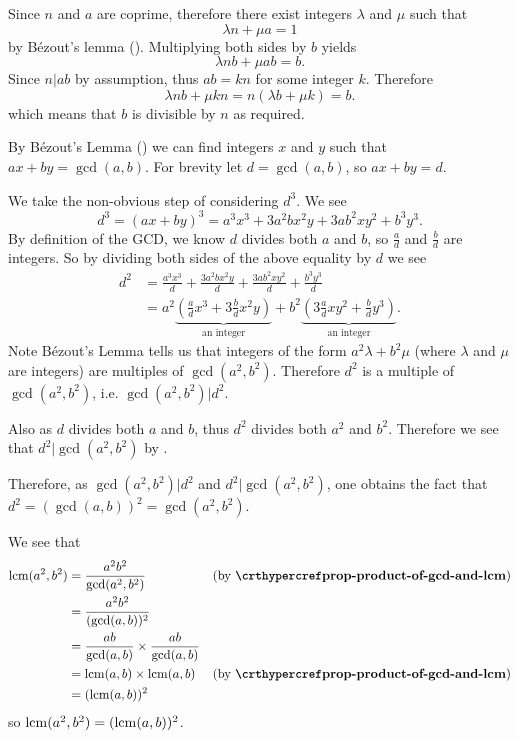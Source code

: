 \begin{questions}
    \item Since $n$ and $a$ are coprime, therefore there exist integers $\lambda$ and $\mu$ such that
    \[
        \lambda n + \mu a = 1
    \]
    by B\'ezout's lemma (). Multiplying both sides by $b$ yields
    \[
        \lambda nb + \mu ab = b.
    \]
    Since $n \vert ab$ by assumption, thus $ab = kn$ for some integer $k$. Therefore
    \[
        \lambda nb + \mu kn = n(\lambda b + \mu k) = b.
    \]
    which means that $b$ is divisible by $n$ as required.

    \item \begin{partquestions}{\roman*}
        \item By B\'{e}zout's Lemma () we can find integers $x$ and $y$ such that $ax + by = \gcd(a, b)$. For brevity let $d = \gcd(a,b)$, so $ax+by=d$.

        We take the non-obvious step of considering $d^3$. We see
        \[
            d^3 = (ax+by)^3 = a^3x^3 + 3a^2bx^2y + 3ab^2xy^2 + b^3y^3.
        \]
        By definition of the GCD, we know $d$ divides both $a$ and $b$, so $\frac ad$ and $\frac bd$ are integers. So by dividing both sides of the above equality by $d$ we see
        \begin{align*}
            d^2 &= \frac{a^3x^3}{d} + \frac{3a^2bx^2y}{d} + \frac{3ab^2xy^2}{d} + \frac{b^3y^3}{d}\\
            &= a^2\underbrace{\left(\frac{a}{d}x^3 + 3\frac{b}{d}x^2y\right)}_{\text{an integer}} + b^2\underbrace{\left(3\frac{a}{d}xy^2 + \frac{b}{d}y^3\right)}_{\text{an integer}}.
        \end{align*}
        Note B\'{e}zout's Lemma tells us that integers of the form $a^2\lambda + b^2\mu$ (where $\lambda$ and $\mu$ are integers) are multiples of $\gcd(a^2, b^2)$. Therefore $d^2$ is a multiple of $\gcd(a^2, b^2)$, i.e. $\gcd(a^2, b^2) \vert d^2$.

        Also as $d$ divides both $a$ and $b$, thus $d^2$ divides both $a^2$ and $b^2$. Therefore we see that $d^2 \vert \gcd(a^2, b^2)$ by .

        Therefore, as $\gcd(a^2, b^2) \vert d^2$ and $d^2 \vert \gcd(a^2, b^2)$, one obtains the fact that $d^2 = (\gcd(a,b))^2 = \gcd(a^2, b^2)$.

        \item We see that
        \begin{align*}
            \lcm(a^2,b^2) &= \frac{a^2b^2}{\gcd(a^2,b^2)} & (\text{by } \myref{prop-product-of-gcd-and-lcm})\\
            &= \frac{a^2b^2}{(\gcd(a,b))^2}\\
            &= \frac{ab}{\gcd(a,b)} \times \frac{ab}{\gcd(a,b)}\\
            &= \lcm(a,b) \times \lcm(a,b) & (\text{by } \myref{prop-product-of-gcd-and-lcm})\\
            &= (\lcm(a,b))^2
        \end{align*}
        so $\mathrm{lcm}(a^2,b^2) = (\mathrm{lcm}(a,b))^2$.
    \end{partquestions}
\end{questions}
